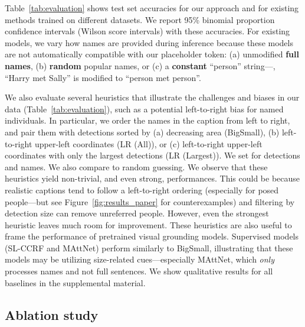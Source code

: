 Table~\ref{tab:evaluation} shows test set accuracies for our approach and for existing methods trained on different datasets. We report 95\% binomial proportion confidence intervals (Wilson score intervals) with these accuracies.
For existing models, we vary how names are provided during inference because these models are not automatically compatible with our placeholder \NAME token: (a) unmodified \textbf{full names}, (b) \textbf{random} popular names, or (c) a \textbf{constant} ``person'' string---\eg, ``Harry met Sally'' is modified to ``person met person''. 

We also evaluate several heuristics that illustrate the challenges and biases in our data (Table~\ref{tab:evaluation}), such as a potential left-to-right bias for named individuals. In particular, we order the names in the caption from left to right, and pair them with detections sorted by (a) decreasing area (BigSmall), (b) left-to-right upper-left coordinates (LR (All)), or (c) left-to-right upper-left coordinates with only the largest  detections (LR (Largest)).
We set  for  detections and  names. We also compare to random guessing.
We observe that these heuristics yield non-trivial, and even strong, performances. This could be because realistic captions tend to follow a left-to-right ordering (especially for posed people---but see Figure~\ref{fig:results_paper} for counterexamples) and filtering by detection size can remove unreferred people.
However, even the strongest heuristic leaves much room for improvement. 
These heuristics are also useful to frame the performance of pretrained visual grounding models. Supervised models (SL-CCRF and MAttNet) perform similarly to BigSmall, illustrating that these models may be utilizing size-related cues---especially MAttNet, which \emph{only} processes names and not full sentences. We show qualitative results for all baselines in the supplemental material.

\subsection{Ablation study}

